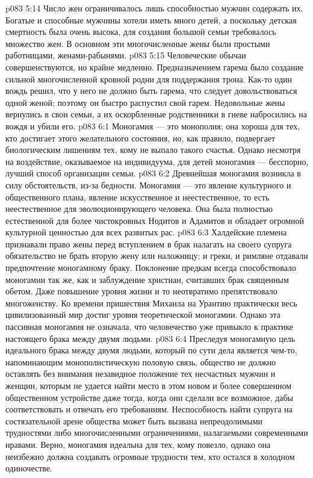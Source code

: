 \vs p083 5:14 Число жен ограничивалось лишь способностью мужчин содержать их. Богатые и способные мужчины хотели иметь много детей, а поскольку детская смертность была очень высока, для создания большой семьи требовалось множество жен. В основном эти многочисленные жены были простыми работницами, женами\hyp{}рабынями.
\vs p083 5:15 Человеческие обычаи совершенствуются, но крайне медленно. Предназначением гарема было создание сильной многочисленной кровной родни для поддержания трона. Как\hyp{}то один вождь решил, что у него не должно быть гарема, что следует довольствоваться одной женой; поэтому он быстро распустил свой гарем. Недовольные жены вернулись в свои семьи, а их оскорбленные родственники в гневе набросились на вождя и убили его.
\vs p083 6:1 Моногамия --- это монополия; она хороша для тех, кто достигает этого желательного состояния, но, как правило, подвергает биологическим лишениям тех, кому не выпало такого счастья. Однако несмотря на воздействие, оказываемое на индивидуума, для детей моногамия --- бесспорно, лучший способ организации семьи.
\vs p083 6:2 Древнейшая моногамия возникла в силу обстоятельств, из\hyp{}за бедности. Моногамия --- это явление культурного и общественного плана, явление искусственное и неестественное, то есть неестественное для эволюционирующего человека. Она была полностью естественной для более чистокровных Нодитов и Адамитов и обладает огромной культурной ценностью для всех развитых рас.
\vs p083 6:3 Халдейские племена признавали право жены перед вступлением в брак налагать на своего супруга обязательство не брать вторую жену или наложницу; и греки, и римляне отдавали предпочтение моногамному браку. Поклонение предкам всегда способствовало моногамии так же, как и заблуждение христиан, считавших брак священным обетом. Даже повышение уровня жизни и то неотвратимо препятствовало многоженству. Ко времени пришествия Михаила на Урантию практически весь цивилизованный мир достиг уровня теоретической моногамии. Однако эта пассивная моногамия не означала, что человечество уже привыкло к практике настоящего брака между двумя людьми.
\vs p083 6:4 \pc Преследуя моногамную цель идеального брака между двумя людьми, который по сути дела является чем\hyp{}то, напоминающим монополистическую половую связь, общество не должно оставлять без внимания незавидное положение тех несчастных мужчин и женщин, которым не удается найти место в этом новом и более совершенном общественном устройстве даже тогда, когда они сделали все возможное, дабы соответствовать и отвечать его требованиям. Неспособность найти супруга на состязательной арене общества может быть вызвана непреодолимыми трудностями либо многочисленными ограничениями, налагаемыми современными нравами. Верно, моногамия идеальна для тех, кому повезло, однако она неизбежно должна создавать огромные трудности тем, кто остался в холодном одиночестве.
